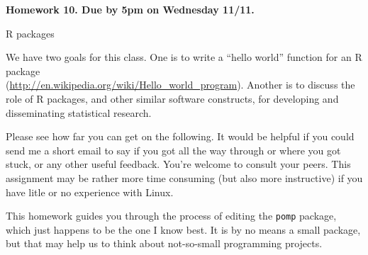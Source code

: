 \documentclass[12pt]{article}
\begin{document}
\begin{center}\bf
Homework 10. Due by 5pm on Wednesday 11/11.

R packages

\end{center}

We have two goals for this class. One is to write a ``hello world'' function for an R package \\
(\url{http://en.wikipedia.org/wiki/Hello_world_program}). Another is to discuss the role of R packages, and other similar software constructs, for developing and disseminating statistical research.

Please see how far you can get on the following. It would be helpful if you could send me a short email to say if you got all the way through or where you got stuck, or any other useful feedback. You're welcome to consult your peers. This assignment may be rather more time consuming (but also more instructive) if you have litle or no experience with Linux.

This homework guides you through the process of editing the \texttt{pomp} package, which just happens to be the one I know best. It is by no means a small package, but that may help us to think about not-so-small programming projects.
\end{document}
